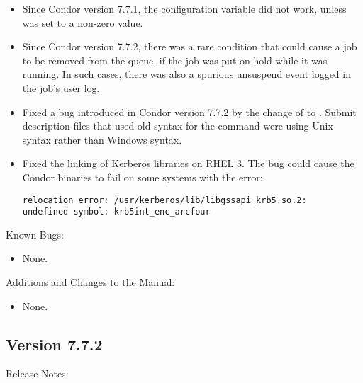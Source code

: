 \begin{itemize}
\item Since Condor version 7.7.1, 
the configuration variable  did not work,
unless  was set to a non-zero value.

\item Since Condor version 7.7.2, there was a rare condition that could cause
a job to be removed from the queue,
if the job was put on hold while it was running.
In such cases, there was also a spurious
unsuspend event logged in the job's user log.

\item Fixed a bug introduced in Condor version 7.7.2 by the change 
of  to .
Submit description files that used old syntax for the 
 command
were using Unix syntax rather than Windows syntax.

\item Fixed the linking of Kerberos libraries on RHEL 3. 
The bug could cause
the Condor binaries to fail on some systems with the error:
\begin{verbatim}
relocation error: /usr/kerberos/lib/libgssapi_krb5.so.2: 
undefined symbol: krb5int_enc_arcfour
\end{verbatim}

\end{itemize}

\noindent Known Bugs:

\begin{itemize}

\item None.

\end{itemize}

\noindent Additions and Changes to the Manual:

\begin{itemize}

\item None.

\end{itemize}


\subsection*{\label{sec:New-7-7-2}Version 7.7.2}

\noindent Release Notes:

